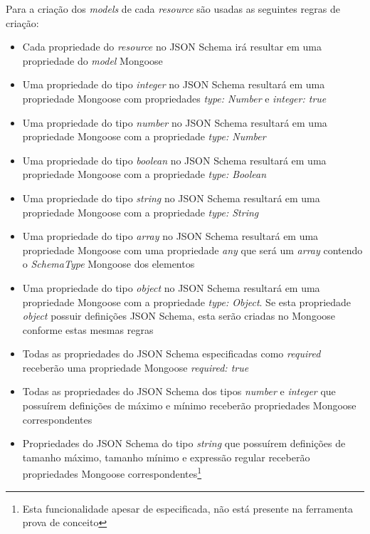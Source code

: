 
\label{sec:bnf:mongo}

Para a criação dos \textit{models} de cada \textit{resource} são usadas as seguintes regras de criação:
\begin{itemize}
    \item Cada propriedade do \textit{resource} no JSON Schema irá resultar em uma propriedade do \textit{model} Mongoose

    \item Uma propriedade do tipo \textit{integer} no JSON Schema resultará em uma propriedade Mongoose com propriedades \textit{type: Number} e \textit{integer: true}

    \item Uma propriedade do tipo \textit{number} no JSON Schema resultará em uma propriedade Mongoose com a propriedade \textit{type: Number}

    \item Uma propriedade do tipo \textit{boolean} no JSON Schema resultará em uma propriedade Mongoose com a propriedade \textit{type: Boolean}

    \item Uma propriedade do tipo \textit{string} no JSON Schema resultará em uma propriedade Mongoose com a propriedade \textit{type: String}

    \item Uma propriedade do tipo \textit{array} no JSON Schema resultará em uma propriedade Mongoose com uma propriedade \textit{any} que será um \textit{array} contendo o \textit{SchemaType} Mongoose dos elementos

    \item Uma propriedade do tipo \textit{object} no JSON Schema resultará em uma propriedade Mongoose com a propriedade \textit{type: Object}. Se esta propriedade \textit{object} possuir definições JSON Schema, esta serão criadas no Mongoose conforme estas mesmas regras

    \item Todas as propriedades do JSON Schema especificadas como \textit{required} receberão uma propriedade Mongoose \textit{required: true}

    \item Todas as propriedades do JSON Schema dos tipos \textit{number} e \textit{integer} que possuírem definições de máximo e mínimo receberão propriedades Mongoose correspondentes

    \item Propriedades do JSON Schema do tipo \textit{string} que possuírem definições de tamanho máximo, tamanho mínimo e expressão regular receberão propriedades Mongoose correspondentes\footnote{Esta funcionalidade apesar de especificada, não está presente na ferramenta prova de conceito}

\end{itemize}


